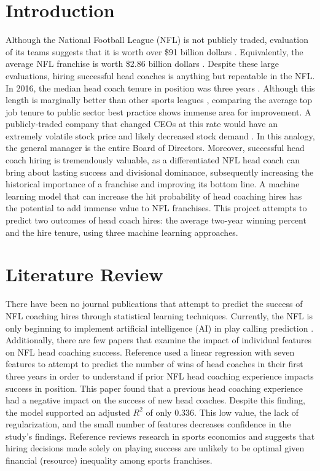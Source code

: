 \documentclass[conference]{IEEEtran}
\begin{document}
\section{Introduction}
Although the National Football League (NFL) is not publicly traded, evaluation of its teams suggests that it is worth over \$91 billion dollars \cite{b1}.  Equivalently, the average NFL franchise is worth \$2.86 billion dollars \cite{b1}. Despite these large evaluations, hiring successful head coaches is anything but repeatable in the NFL. In 2016, the median head coach tenure in position was three years \cite{b2}. Although this length is marginally better than other sports leagues \cite{b2}, comparing the average top job tenure to public sector best practice shows immense area for improvement. A publicly-traded company that changed CEOs at this rate would have an extremely volatile stock price and likely decreased stock demand \cite{b3}. In this analogy, the general manager is the entire Board of Directors. Moreover, successful head coach hiring is tremendously valuable, as a differentiated NFL head coach can bring about lasting success and divisional dominance, subsequently increasing the historical importance of a franchise and improving its bottom line. A machine learning model that can increase the hit probability of head coaching hires has the potential to add immense value to NFL franchises. This project attempts to predict two outcomes of head coach hires: the average two-year winning percent and the hire tenure, using three machine learning approaches.

\section{Literature Review}
There have been no journal publications that attempt to predict the success of NFL coaching hires through statistical learning techniques. Currently, the NFL is only beginning to implement artificial intelligence (AI) in play calling prediction \cite{b4}. Additionally, there are few papers that examine the impact of individual features on NFL head coaching success. Reference \cite{b5} used a linear regression with seven features to attempt to predict the number of wins of head coaches in their first three years in order to understand if prior NFL head coaching experience impacts success in position. This paper found that a previous head coaching experience had a negative impact on the success of new head coaches. Despite this finding, the model supported an adjusted $R^2$ of only $0.336$. This low value, the lack of regularization, and the small number of features  decreases confidence in the study's findings. Reference \cite{b6} reviews research in sports economics and suggests that hiring decisions made solely on playing success are unlikely to be optimal given financial (resource) inequality among sports franchises. 
\end{document}
